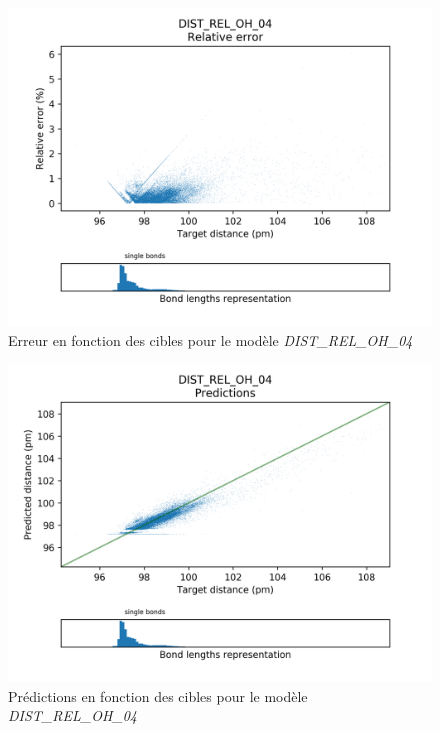 \begin{figure}[!h]
	\centering
	
	\includegraphics[scale=0.8]{../figures/DIST_REL_OH_04/DIST_REL_OH_04_distrib_rmse_dist.png}	
	
	\caption{Erreur en fonction des cibles pour le modèle \emph{DIST\_REL\_OH\_04}}
\end{figure}

\begin{figure}[!h]
	\centering
	
	\includegraphics[scale=0.8]{../figures/DIST_REL_OH_04/DIST_REL_OH_04_preds_targets.png}	
	
	\caption{Prédictions en fonction des cibles pour le modèle \emph{DIST\_REL\_OH\_04}}
	
\end{figure}

